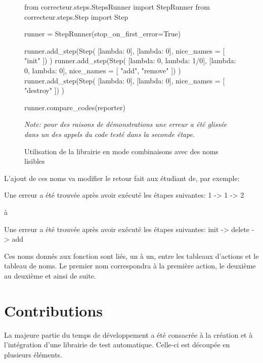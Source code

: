 \documentclass[a4paper]{report}
\begin{document}
\begin{figure}[ht]
\begin{python}
from correcteur.steps.StepsRunner import StepRunner
from correcteur.steps.Step import Step

runner = StepRunner(stop_on_first_error=True)

runner.add_step(Step(
	[lambda: 0],
	[lambda: 0],
	nice_names = [
		"init"
	])
)
runner.add_step(Step(
	[lambda: 0, lambda: 1/0],
	[lambda: 0, lambda: 0],
	nice_names = [
		"add",
		"remove"
	])
)
runner.add_step(Step(
	[lambda: 0],
	[lambda: 0],
	nice_names = [
		"destroy"
	])
)

runner.compare_codes(reporter)
\end{python}
	\caption{Utilisation de la librairie en mode combinaisons avec des noms lisibles}
	
	\textit{Note: pour des raisons de démonstrations une erreur a été glissée dans un des appels du code testé dans la seconde étape.}
	
	\label{fig:combinaisons_ref_name}
\end{figure}

L'ajout de ces noms va modifier le retour fait aux étudiant de, par exemple:
\begin{center}
Une erreur a été trouvée après avoir exécuté les étapes suivantes: 1 -> 1 -> 2
\end{center}
à
\begin{center}
Une erreur a été trouvée après avoir exécuté les étapes suivantes: init -> delete -> add
\end{center}

Ces noms donnés aux fonction sont liés, un à un, entre les tableaux d'actions et le tableau de noms.
Le premier nom correspondra à la première action, le deuxième au deuxième et ainsi de suite.




\chapter{Contributions}

La majeure partie du temps de développement a été consacrée à la création et à l'intégration d'une librairie de test automatique.
Celle-ci est découpée en plusieurs éléments.
\end{document}
